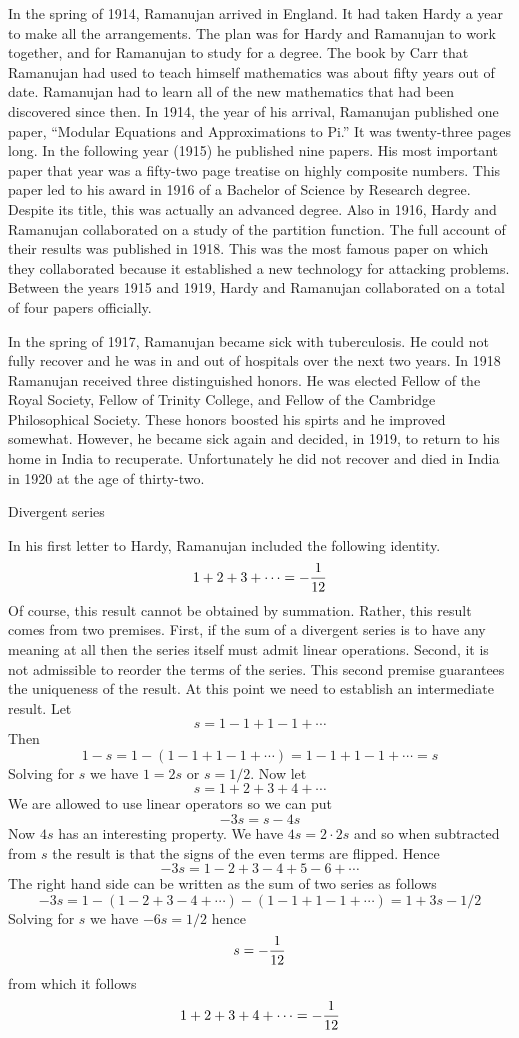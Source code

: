 In the spring of 1914, Ramanujan arrived in England.
It had taken Hardy a year to make all the arrangements.
The plan was for Hardy and Ramanujan to work together,
and for Ramanujan to study for a degree.
The book by Carr that Ramanujan had used to teach himself
mathematics was about fifty years out of date.
Ramanujan had to learn all of the new mathematics that had
been discovered since then.
In 1914, the year of his arrival, Ramanujan published one
paper, ``Modular Equations and Approximations to Pi.''
It was twenty-three pages long.
In the following year (1915) he published nine papers.
His most important paper that year was a fifty-two page treatise on highly composite numbers.
This paper led to his award in 1916 of a Bachelor of Science by Research degree.
Despite its title, this was actually an advanced degree.
Also in 1916, Hardy and Ramanujan collaborated on a study of the partition function.
The full account of their results was published in 1918.
This was the most famous paper on which they collaborated because it
established a new technology for attacking problems.
Between the years 1915 and 1919, Hardy and Ramanujan collaborated
on a total of four papers officially.

In the spring of 1917, Ramanujan became sick with tuberculosis.
He could not fully recover and he was in and out of hospitals over the next two years.
In 1918 Ramanujan received three distinguished honors.
He was elected Fellow of the Royal Society, Fellow of Trinity College, and Fellow of the
Cambridge Philosophical Society.
These honors boosted his spirts and he improved somewhat.
However, he became sick again and decided, in 1919, to return to his
home in India to recuperate.
Unfortunately he did not recover and died in India in 1920 at the age of thirty-two.

 Divergent series

In his first letter to Hardy, Ramanujan included the following identity.
$$1+2+3+\cdots=-{1\over12}$$
Of course, this result cannot be obtained by summation.
Rather, this result comes from two premises.
First, if the sum of a divergent series is to have any meaning at all then the series
itself must admit linear operations.
Second, it is not admissible to reorder the terms of the series.
This second premise guarantees the uniqueness of the result.
At this point we need to establish an intermediate result. Let
$$s=1-1+1-1+\cdots$$
Then
$$1-s=1-(1-1+1-1+\cdots)=1-1+1-1+\cdots=s$$
Solving for $s$ we have $1=2s$ or $s=1/2$.
Now let
$$s=1+2+3+4+\cdots$$
We are allowed to use linear operators so we can put
$$-3s=s-4s$$
Now $4s$ has an interesting property. We have $4s=2\cdot2s$ and so when subtracted
from $s$ the result is that the signs of the even terms are flipped. Hence
$$-3s=1-2+3-4+5-6+\cdots$$
The right hand side can be written as the sum of two series as follows
$$-3s=1-(1-2+3-4+\cdots)-(1-1+1-1+\cdots)=1+3s-1/2$$
Solving for $s$ we have $-6s=1/2$ hence
$$s=-{1\over12}$$
from which it follows
$$1+2+3+4+\cdots=-{1\over12}$$


